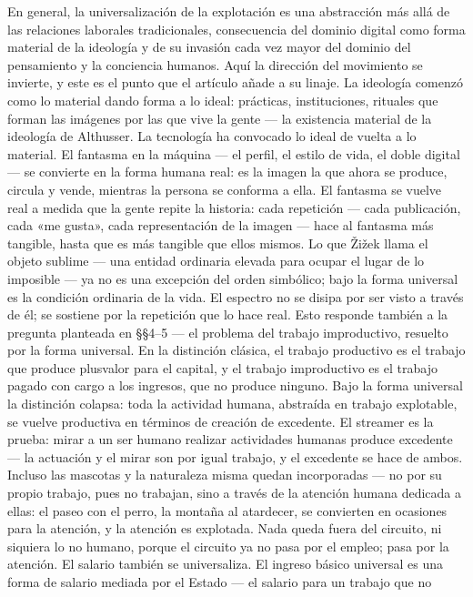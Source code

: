 \documentclass[11pt]{article}
\begin{document}
En general, la universalización de la explotación
es una abstracción más allá de las relaciones laborales tradicionales,
consecuencia del dominio digital como forma material de la ideología y de
su invasión cada vez mayor del dominio del pensamiento y la conciencia
humanos. Aquí la dirección del movimiento se invierte, y este es el
punto que el artículo añade a su linaje. La ideología comenzó como lo
material dando forma a lo ideal: prácticas, instituciones, rituales que
forman las imágenes por las que vive la gente --- la existencia material
de la ideología de Althusser. La tecnología ha convocado lo ideal de
vuelta a lo material. El fantasma en la máquina --- el perfil, el estilo
de vida, el doble digital --- se convierte en la forma humana real: es
la imagen la que ahora se produce, circula y vende, mientras la persona
se conforma a ella. El fantasma se vuelve real a medida que la gente
repite la historia: cada repetición --- cada publicación, cada «me
gusta», cada representación de la imagen --- hace al fantasma más
tangible, hasta que es más tangible que ellos mismos. Lo que
\v{Z}i\v{z}ek llama el objeto sublime --- una entidad ordinaria elevada
para ocupar el lugar de lo imposible --- ya no es una excepción del
orden simbólico; bajo la forma universal es la condición ordinaria de la
vida. El espectro no se disipa por ser visto a través de él; se sostiene
por la repetición que lo hace real. Esto responde también a la pregunta
planteada en §§4--5 --- el problema del trabajo improductivo, resuelto
por la forma universal. En la distinción clásica,
el trabajo productivo es el trabajo que produce plusvalor para el
capital, y el trabajo improductivo es el trabajo pagado con cargo a los
ingresos, que no produce ninguno. Bajo la forma universal la distinción
colapsa: toda la actividad humana, abstraída en trabajo explotable, se
vuelve productiva en términos de creación de excedente. El streamer es
la prueba: mirar a un ser humano realizar actividades humanas produce
excedente --- la actuación y el mirar son por igual trabajo, y el
excedente se hace de ambos. Incluso las mascotas y la naturaleza misma
quedan incorporadas --- no por su propio trabajo, pues no trabajan, sino
a través de la atención humana dedicada a ellas: el paseo con el perro,
la montaña al atardecer, se convierten en ocasiones para la atención, y
la atención es explotada. Nada queda fuera del circuito, ni siquiera lo
no humano, porque el circuito ya no pasa por el empleo; pasa por la
atención. El salario
también se universaliza. El ingreso básico universal es una forma de
salario mediada por el Estado --- el salario para un trabajo que no
\end{document}
